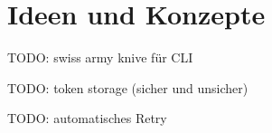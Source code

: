 \section{Ideen und Konzepte}

TODO: swiss army knive \cite[p. 290]{gopl} für CLI

TODO: token storage (sicher und unsicher)

TODO: automatisches Retry

